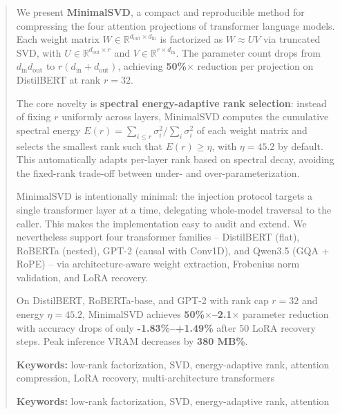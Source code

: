 \documentclass{article}
\begin{document}
\maketitle

\begin{abstract}
We present \textbf{MinimalSVD}, a compact and reproducible method for compressing 
the four attention projections of transformer language models. Each weight 
matrix $W \in \mathbb{R}^{d_\text{out} \times d_\text{in}}$ is factorized as 
$W \approx U V$ via truncated SVD, with $U \in \mathbb{R}^{d_\text{out} \times r}$ 
and $V \in \mathbb{R}^{r \times d_\text{in}}$. The parameter count drops from 
$d_\text{in} d_\text{out}$ to $r(d_\text{in} + d_\text{out})$, achieving 
\textbf{50\%$\times$} reduction per projection on DistilBERT at rank $r = 32$.

The core novelty is \textbf{spectral energy-adaptive rank selection}: instead of 
fixing $r$ uniformly across layers, MinimalSVD computes the cumulative 
spectral energy $E(r) = \sum_{i \le r} \sigma_i^2 / \sum_i \sigma_i^2$ of 
each weight matrix and selects the smallest rank such that $E(r) \ge \eta$, 
with $\eta = 45.2$ by default. This automatically adapts per-layer 
rank based on spectral decay, avoiding the fixed-rank trade-off between 
under- and over-parameterization.

MinimalSVD is intentionally minimal: the injection protocol targets a single 
transformer layer at a time, delegating whole-model traversal to the caller. 
This makes the implementation easy to audit and extend. We nevertheless 
support four transformer families -- DistilBERT (flat), RoBERTa (nested), 
GPT-2 (causal with Conv1D), and Qwen3.5 (GQA + RoPE) -- via architecture-aware 
weight extraction, Frobenius norm validation, and LoRA recovery.

On DistilBERT, RoBERTa-base, and GPT-2 with rank cap $r = 32$ and 
energy $\eta = 45.2$, MinimalSVD achieves \textbf{50\%$\times$--2.1$\times$} 
parameter reduction with accuracy drops of only \textbf{-1.83\%--+1.49\%} 
after 50 LoRA recovery steps. Peak inference VRAM decreases 
by \textbf{380 MB\%}.

\textbf{Keywords:} low-rank factorization, SVD, energy-adaptive rank, attention 
compression, LoRA recovery, multi-architecture transformers



\vspace{0.5em}
\noindent\textbf{Keywords:} low-rank factorization, SVD, energy-adaptive rank, attention
\end{abstract}
\end{document}
